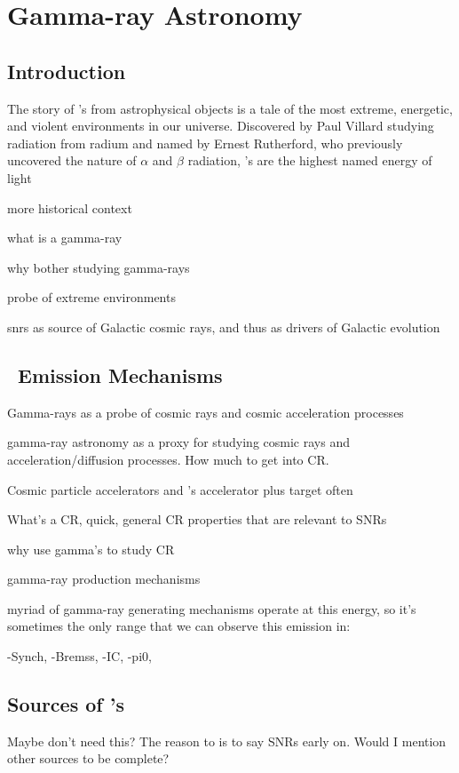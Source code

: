 \chapter{Gamma-ray Astronomy }
\label{chap:gamAstr}

\section{Introduction}\label{gamAstr:intro}
The story of \gam 's from astrophysical objects is a tale of the most extreme, energetic, and violent environments in our universe. Discovered by Paul Villard studying radiation from radium and named by Ernest Rutherford, who previously uncovered the nature of $\alpha$ and $\beta$ radiation, \gam's are the highest named energy of light 

more historical context 

what is a gamma-ray

why bother studying gamma-rays

probe of extreme environments

snrs as source of Galactic cosmic rays, and thus as drivers of Galactic evolution

\section{\gam~Emission Mechanisms }\label{gamAstr:CR}
Gamma-rays as a probe of cosmic rays and cosmic acceleration processes

gamma-ray astronomy as  a proxy for studying cosmic rays and acceleration/diffusion processes. How much to get into CR. 

Cosmic particle accelerators and \gam's
accelerator plus target often 


What's a CR, quick,  general CR properties that are relevant to SNRs

why use gamma's  to study CR

gamma-ray production mechanisms

myriad of gamma-ray generating mechanisms operate at this energy, so it's sometimes the only range that we can observe this emission in:

-Synch,
-Bremss,
-IC,
-pi0,

\section{Sources of \gam's}\label{gamAstr:Sources}
Maybe don't need this? The reason to is to say SNRs early on. Would I mention other sources to be complete?

